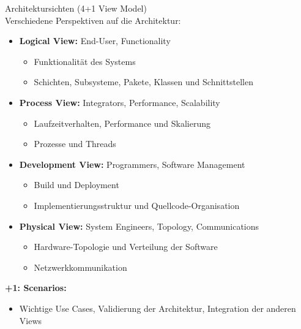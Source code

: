 \begin{concept}{Architektursichten (4+1 View Model)}\\
Verschiedene Perspektiven auf die Architektur:

\begin{itemize}
    \item \textbf{Logical View:} End-User, Functionality
    \begin{itemize}
        \item Funktionalität des Systems
        \item Schichten, Subsysteme, Pakete, Klassen und Schnittstellen
    \end{itemize}
    
    \item \textbf{Process View:} Integrators, Performance, Scalability
    \begin{itemize}
        \item Laufzeitverhalten, Performance und Skalierung
        \item Prozesse und Threads
    \end{itemize}

    \item \textbf{Development View:} Programmers, Software Management
    \begin{itemize}
        \item Build und Deployment
        \item Implementierungsstruktur und Quellcode-Organisation
    \end{itemize}
    
    \item \textbf{Physical View:} System Engineers, Topology, Communications
    \begin{itemize}
        \item Hardware-Topologie und Verteilung der Software
        \item Netzwerkkommunikation
    \end{itemize}
\end{itemize}
    
\textbf{+1: Scenarios:}
    \begin{itemize}
        \item Wichtige Use Cases, Validierung der Architektur, Integration der anderen Views
    \end{itemize}


\end{concept}
